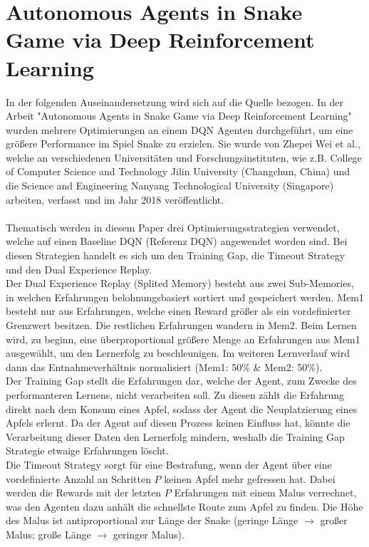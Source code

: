 \section{Autonomous Agents in Snake Game via Deep Reinforcement Learning} \label{sec:Paper_1}
In der folgenden Auseinandersetzung wird sich auf die Quelle \cite{Autonomous_Agents_in_Snake_Game_via_DRL} bezogen.
In der Arbeit "Autonomous Agents in Snake Game via Deep Reinforcement Learning" wurden mehrere Optimierungen an einem DQN Agenten durchgeführt, um eine größere Performance im Spiel Snake zu erzielen. Sie wurde von Zhepei Wei et al., welche an verschiedenen Universitäten und Forschungsinstituten, wie z.B. College of Computer Science and Technology Jilin University (Changchun, China) und die Science and Engineering Nanyang Technological University (Singapore) arbeiten, verfasst und im Jahr 2018 veröffentlicht.\\
\\Thematisch werden in diesem Paper drei Optimierungsstrategien verwendet, welche auf einen Baseline DQN (Referenz DQN) angewendet worden sind. Bei diesen Strategien handelt es sich um den Training Gap, die Timeout Strategy und den Dual Experience Replay.\\
Der Dual Experience Replay (Splited Memory) besteht aus zwei Sub-Memories, in welchen Erfahrungen belohnungsbasiert sortiert und gespeichert werden. Mem1 besteht nur aus Erfahrungen, welche einen Reward größer als ein vordefinierter Grenzwert besitzen. Die restlichen Erfahrungen wandern in Mem2. Beim Lernen wird, zu beginn, eine überproportional größere Menge an Erfahrungen aus Mem1 ausgewählt, um den Lernerfolg zu beschleunigen. Im weiteren Lernverlauf wird dann das Entnahmeverhältnis normalisiert (Mem1: 50\% \& Mem2: 50\%).\\
Der Training Gap stellt die Erfahrungen dar, welche der Agent, zum Zwecke des performanteren Lernens, nicht verarbeiten soll. Zu diesen zählt die Erfahrung direkt nach dem Konsum eines Apfel, sodass der Agent die Neuplatzierung eines Apfels erlernt. Da der Agent auf diesen Prozess keinen Einfluss hat, könnte die Verarbeitung dieser Daten den Lernerfolg mindern, weshalb die Training Gap Strategie etwaige Erfahrungen löscht.\\
Die Timeout Strategy sorgt für eine Bestrafung, wenn der Agent über eine vordefinierte Anzahl an Schritten $P$ keinen Apfel mehr gefressen hat. Dabei werden die Rewards mit der letzten $P$ Erfahrungen mit einem Malus verrechnet, was den Agenten dazu anhält die schnellste Route zum Apfel zu finden. Die Höhe des Malus ist antiproportional zur Länge der Snake (geringe Länge $\rightarrow$ großer Malus; große Länge $\rightarrow$ geringer Malus).\\
